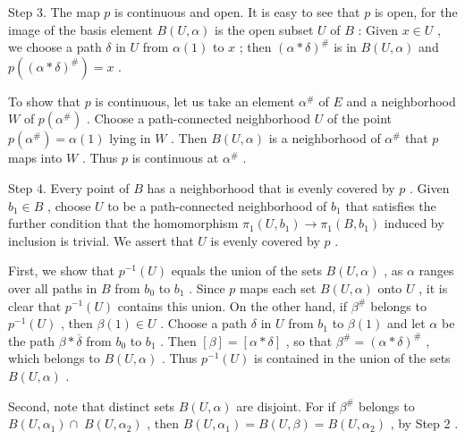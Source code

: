 \documentclass[10pt]{article}
\begin{document}
Step 3. The map \(p\) is continuous and open. It is easy to see that \(p\) is open, for the image of the basis element \(B\left( {U,\alpha }\right)\) is the open subset \(U\) of \(B\) : Given \(x \in  U\) , we choose a path \(\delta\) in \(U\) from \(\alpha \left( 1\right)\) to \(x\) ; then \({\left( \alpha  * \delta \right) }^{\# }\) is in \(B\left( {U,\alpha }\right)\) and \(p\left( {\left( \alpha  * \delta \right) }^{\# }\right)  = x\) .

To show that \(p\) is continuous, let us take an element \({\alpha }^{\# }\) of \(E\) and a neighborhood \(W\) of \(p\left( {\alpha }^{\# }\right)\) . Choose a path-connected neighborhood \(U\) of the point \(p\left( {\alpha }^{\# }\right)  = \alpha \left( 1\right)\) lying in \(W\) . Then \(B\left( {U,\alpha }\right)\) is a neighborhood of \({\alpha }^{\# }\) that \(p\) maps into \(W\) . Thus \(p\) is continuous at \({\alpha }^{\# }\) .

Step 4. Every point of \(B\) has a neighborhood that is evenly covered by \(p\) . Given \({b}_{1} \in  B\) , choose \(U\) to be a path-connected neighborhood of \({b}_{1}\) that satisfies the further condition that the homomorphism \({\pi }_{1}\left( {U,{b}_{1}}\right)  \rightarrow  {\pi }_{1}\left( {B,{b}_{1}}\right)\) induced by inclusion is trivial. We assert that \(U\) is evenly covered by \(p\) .

First, we show that \({p}^{-1}\left( U\right)\) equals the union of the sets \(B\left( {U,\alpha }\right)\) , as \(\alpha\) ranges over all paths in \(B\) from \({b}_{0}\) to \({b}_{1}\) . Since \(p\) maps each set \(B\left( {U,\alpha }\right)\) onto \(U\) , it is clear that \({p}^{-1}\left( U\right)\) contains this union. On the other hand, if \({\beta }^{\# }\) belongs to \({p}^{-1}\left( U\right)\) , then \(\beta \left( 1\right)  \in  U\) . Choose a path \(\delta\) in \(U\) from \({b}_{1}\) to \(\beta \left( 1\right)\) and let \(\alpha\) be the path \(\beta  * \overline{\delta }\) from \({b}_{0}\) to \({b}_{1}\) . Then \(\left\lbrack  \beta \right\rbrack   = \left\lbrack  {\alpha  * \delta }\right\rbrack\) , so that \({\beta }^{\# } = {\left( \alpha  * \delta \right) }^{\# }\) , which belongs to \(B\left( {U,\alpha }\right)\) . Thus \({p}^{-1}\left( U\right)\) is contained in the union of the sets \(B\left( {U,\alpha }\right)\) .

Second, note that distinct sets \(B\left( {U,\alpha }\right)\) are disjoint. For if \({\beta }^{\# }\) belongs to \(B\left( {U,{\alpha }_{1}}\right)  \cap \; B\left( {U,{\alpha }_{2}}\right)\) , then \(B\left( {U,{\alpha }_{1}}\right)  = B\left( {U,\beta }\right)  = B\left( {U,{\alpha }_{2}}\right)\) , by Step 2 .
\end{document}
